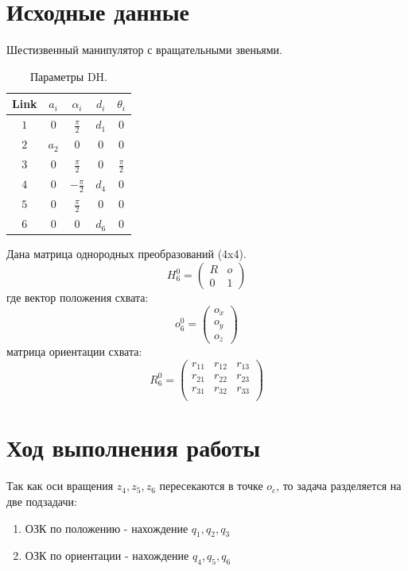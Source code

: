 \documentclass[a4paper,14pt]{extreport}
\begin{document}
	\section{Исходные данные}
	Шестизвенный манипулятор с вращательными звеньями.
\begin{table}[H]
	\caption{\label{tab:canonsummary}Параметры DH.}
	\begin{center}
		\begin{tabular}{|c|c|c|c|c|}
			\hline
			Link & $a_i$ & $\alpha_i $ & $d_i$ & $\theta_i$ \\
			\hline
			$1$ & $0$ & $\frac{\pi}{2}$ & $d_1$ & $0$ \\
			\hline
			$2$ & $a_2$ & $0$ & $0$ & $0$ \\
			\hline
			$3$ & $0$ & $\frac{\pi}{2}$ & $0$ & $\frac{\pi}{2}$ \\
			\hline
			$4$ & $0$ & $-\frac{\pi}{2}$ & $d_4$ & $0$ \\
			\hline
			$5$ & $0$ & $\frac{\pi}{2}$ & $0$ & $0$ \\
			\hline
			$6$ & $0$ & $0$ & $d_6$ & $0$ \\
			\hline
		\end{tabular}
	\end{center}
\end{table} 
	Дана матрица однородных преобразований (4x4).
	\begin{equation}
		H^0_6 = 
		\begin{pmatrix}
			R & o\\
			0 & 1
		\end{pmatrix}
	\end{equation}
	где вектор положения схвата:
	\begin{equation}
		o^0_6 = 
		\begin{pmatrix}
			o_x\\
			o_y\\
			o_z
		\end{pmatrix}
	\end{equation}
	матрица ориентации схвата:
	\begin{equation}
		R^0_6 = 
		\begin{pmatrix}
			r_{11} & r_{12} & r_{13}\\
			r_{21} & r_{22} & r_{23}\\
			r_{31} & r_{32} & r_{33}\\
		\end{pmatrix}
	\end{equation}
	
	\section{Ход выполнения работы}
	Так как оси вращения $z_4, z_5, z_6$ пересекаются в точке $o_c$, то задача разделяется на две подзадачи:
	\begin{enumerate}
		\item ОЗК по положению - нахождение $q_1, q_2, q_3$
		\item ОЗК по ориентации - нахождение $q_4, q_5, q_6$	
	\end{enumerate}
\end{document}
